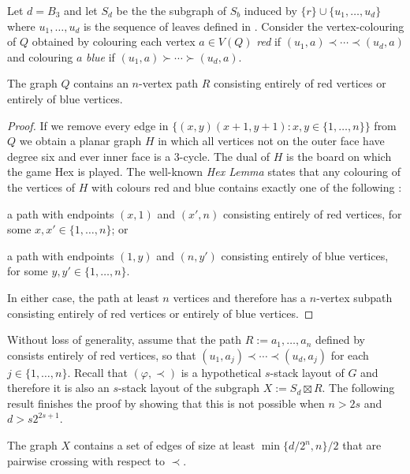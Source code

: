 \documentclass[kpfonts]{patmorin}
\begin{document}
Let $d=B_3$ and let $S_d$ be the the subgraph of $S_b$ induced by $\{r\}\cup\{u_1,\ldots,u_{d}\}$ where $u_1,\ldots,u_d$ is the sequence of leaves defined in .  Consider the vertex-colouring of $Q$ obtained by colouring each vertex $a\in V(Q)$ \emph{red} if $(u_1,a)\prec\cdots\prec (u_d,a)$ and colouring $a$ \emph{blue} if $(u_1,a)\succ\cdots\succ(u_d,a)$.

\begin{lem}
    The graph $Q$ contains an $n$-vertex path $R$ consisting entirely of red vertices or entirely of blue vertices.
\end{lem}

\begin{proof}
    If we remove every edge in $\{(x,y)(x+1,y+1):x,y\in\{1,\ldots,n\}\}$ from $Q$ we obtain a planar graph $H$ in which all vertices not on the outer face have degree six and ever inner face is a 3-cycle.  The dual of $H$ is the board on which the game Hex is played.  The well-known \emph{Hex Lemma} states that any colouring of the vertices of $H$ with colours red and blue contains exactly one of the following \cite{hex_lemma}:
    \begin{compactenum}
        \item a path with endpoints $(x,1)$ and $(x',n)$ consisting entirely of red vertices, for some $x,x'\in\{1,\ldots,n\}$; or
        \item a path with endpoints $(1,y)$ and $(n,y')$ consisting entirely of blue vertices, for some $y,y'\in\{1,\ldots,n\}$.
    \end{compactenum}
    In either case, the path at least $n$ vertices and therefore has a $n$-vertex subpath consisting entirely of red vertices or entirely of blue vertices.
\end{proof}

Without loss of generality, assume that the path $R:=a_1,\ldots,a_n$ defined by  consists entirely of red vertices, so that $(u_1,a_j)\prec\cdots\prec (u_d,a_j)$ for each $j\in\{1,\ldots,n\}$.
Recall that $(\varphi,\prec)$ is a hypothetical $s$-stack layout of $G$ and therefore it is also an $s$-stack layout of the subgraph $X:=S_d\boxtimes R$.  The following result finishes the proof by showing that this is not possible when $n> 2s$ and $d> s2^{2s+1}$.

\begin{lem}
    The graph $X$ contains a set of edges of size at least $\min\{d/2^{n},n\}/2$ that are pairwise crossing with respect to $\prec$.
\end{lem}
\end{document}
